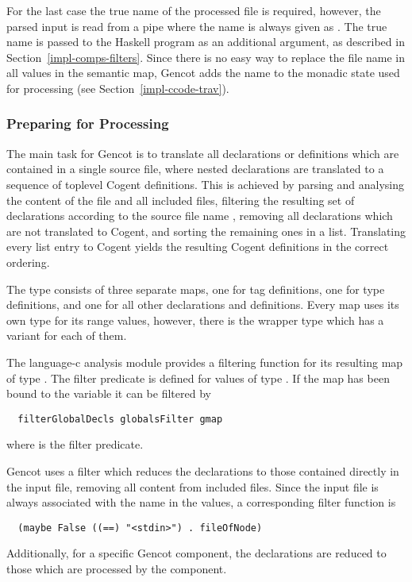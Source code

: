 For the last case the true name of the processed file is required, however, the parsed input is read from a pipe where
the name is always given as . The true name is passed to the Haskell program as an additional 
argument, as described in Section~\ref{impl-comps-filters}. Since there is no easy way to replace the file name in
all  values in the semantic map, Gencot adds the name to the monadic state used for processing
(see Section~\ref{impl-ccode-trav}).

\subsubsection{Preparing for Processing}

The main task for Gencot is to translate all declarations or definitions which are contained in a single source file, where
nested declarations are translated to a sequence of toplevel Cogent definitions. This is achieved by parsing and analysing
the content of the file and all included files, filtering the resulting set of declarations according to the source file name
, removing all declarations which are not translated to Cogent, and sorting the remaining ones in a list. 
Translating every list entry to Cogent yields the resulting Cogent definitions in the correct ordering.

The type  consists of three separate maps, one for tag definitions, one for type definitions,
and one for all other declarations and definitions. Every map uses its own type for its range values, however, 
there is the wrapper type  which has a variant for each of them. 

The language-c analysis module provides a filtering function for its resulting map of type . The filter 
predicate is defined for values of type . If the map has been bound to the variable 
it can be filtered by
\begin{verbatim}
  filterGlobalDecls globalsFilter gmap
\end{verbatim}
where  is the filter predicate.

Gencot uses a filter which reduces the declarations to those contained directly in the input file, removing all
content from included files. Since the input file is always associated with the name  in the 
values, a corresponding filter function is
\begin{verbatim}
  (maybe False ((==) "<stdin>") . fileOfNode)
\end{verbatim}
Additionally, for a specific Gencot component, the declarations are reduced to those which are processed by the component. 

